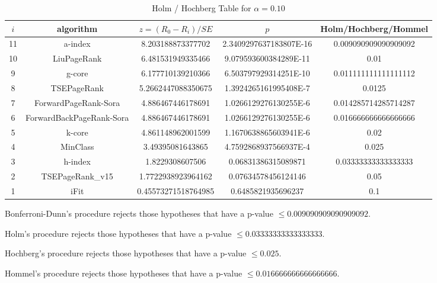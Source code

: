 \documentclass[a4paper,10pt]{article}
\begin{document}
\begin{landscape}
\begin{table}[!htp]
\centering\tiny
\caption{Holm / Hochberg Table for $\alpha=0.10$}
\begin{tabular}{ccccc}
$i$&algorithm&$z=(R_0 - R_i)/SE$&$p$&Holm/Hochberg/Hommel\\
\hline
11&a-index&8.203188873377702&2.3409297637183807E-16&0.009090909090909092\\
10&LiuPageRank&6.481531949335466&9.079593600384289E-11&0.01\\
9&g-core&6.177710139210366&6.503797929314251E-10&0.011111111111111112\\
8&TSEPageRank&5.2662447088350675&1.3924265161995408E-7&0.0125\\
7&ForwardPageRank-Sora&4.886467446178691&1.0266129276130255E-6&0.014285714285714287\\
6&ForwardBackPageRank-Sora&4.886467446178691&1.0266129276130255E-6&0.016666666666666666\\
5&k-core&4.861148962001599&1.1670638865603941E-6&0.02\\
4&MinClass&3.49395081643865&4.7592868937566937E-4&0.025\\
3&h-index&1.8229308607506&0.06831386315089871&0.03333333333333333\\
2&TSEPageRank_v15&1.7722938923964162&0.07634578456124146&0.05\\
1&iFit&0.45573271518764985&0.6485821935696237&0.1\\
\hline
\end{tabular}
\end{table}
Bonferroni-Dunn's procedure rejects those hypotheses that have a p-value $\le0.009090909090909092$.


Holm's procedure rejects those hypotheses that have a p-value $\le0.03333333333333333$.


Hochberg's procedure rejects those hypotheses that have a p-value $\le0.025$.


Hommel's procedure rejects those hypotheses that have a p-value $\le0.016666666666666666$.



\end{landscape}
\end{document}
